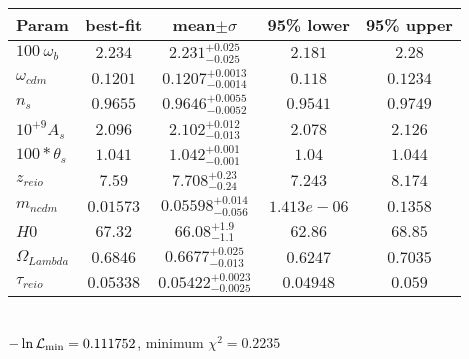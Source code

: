 \begin{tabular}{|l|c|c|c|c|} 
 \hline 
Param & best-fit & mean$\pm\sigma$ & 95\% lower & 95\% upper \\ \hline 
$100~\omega{}_{b }$ &$2.234$ & $2.231_{-0.025}^{+0.025}$ & $2.181$ & $2.28$ \\ 
$\omega{}_{cdm }$ &$0.1201$ & $0.1207_{-0.0014}^{+0.0013}$ & $0.118$ & $0.1234$ \\ 
$n_{s }$ &$0.9655$ & $0.9646_{-0.0052}^{+0.0055}$ & $0.9541$ & $0.9749$ \\ 
$10^{+9}A_{s }$ &$2.096$ & $2.102_{-0.013}^{+0.012}$ & $2.078$ & $2.126$ \\ 
$100*\theta{}_{s }$ &$1.041$ & $1.042_{-0.001}^{+0.001}$ & $1.04$ & $1.044$ \\ 
$z_{reio }$ &$7.59$ & $7.708_{-0.24}^{+0.23}$ & $7.243$ & $8.174$ \\ 
$m_{ncdm }$ &$0.01573$ & $0.05598_{-0.056}^{+0.014}$ & $1.413e-06$ & $0.1358$ \\ 
$H0$ &$67.32$ & $66.08_{-1.1}^{+1.9}$ & $62.86$ & $68.85$ \\ 
$\Omega{}_{Lambda }$ &$0.6846$ & $0.6677_{-0.013}^{+0.025}$ & $0.6247$ & $0.7035$ \\ 
$\tau{}_{reio }$ &$0.05338$ & $0.05422_{-0.0025}^{+0.0023}$ & $0.04948$ & $0.059$ \\ 
\hline 
 \end{tabular} \\ 
$-\ln{\cal L}_\mathrm{min} =0.111752$, minimum $\chi^2=0.2235$ \\ 
